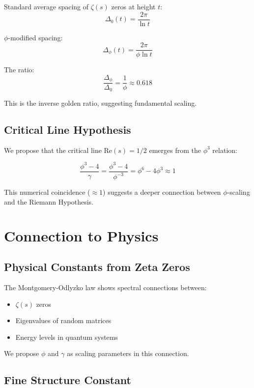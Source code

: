 \documentclass[12pt,a4paper]{article}
\begin{document}
Standard average spacing of $\zeta(s)$ zeros at height $t$:
\begin{equation}
\Delta_0(t) = \frac{2\pi}{\ln t}
\end{equation}

$\phi$-modified spacing:
\begin{equation}
\Delta_\phi(t) = \frac{2\pi}{\phi \ln t}
\end{equation}

The ratio:
\begin{equation}
\frac{\Delta_\phi}{\Delta_0} = \frac{1}{\phi} \approx 0.618
\end{equation}

This is the inverse golden ratio, suggesting fundamental scaling.

\subsection{Critical Line Hypothesis}

We propose that the critical line $\text{Re}(s) = 1/2$ emerges from the $\phi^3$ relation:

\begin{equation}
\frac{\phi^3 - 4}{\gamma} = \frac{\phi^3 - 4}{\phi^{-3}} = \phi^6 - 4\phi^3 \approx 1
\end{equation}

This numerical coincidence ($\approx 1$) suggests a deeper connection between $\phi$-scaling and the Riemann Hypothesis.

\section{Connection to Physics}

\subsection{Physical Constants from Zeta Zeros}

The Montgomery-Odlyzko law shows spectral connections between:
\begin{itemize}
\item $\zeta(s)$ zeros
\item Eigenvalues of random matrices
\item Energy levels in quantum systems
\end{itemize}

We propose $\phi$ and $\gamma$ as scaling parameters in this connection.

\subsection{Fine Structure Constant}
\end{document}
